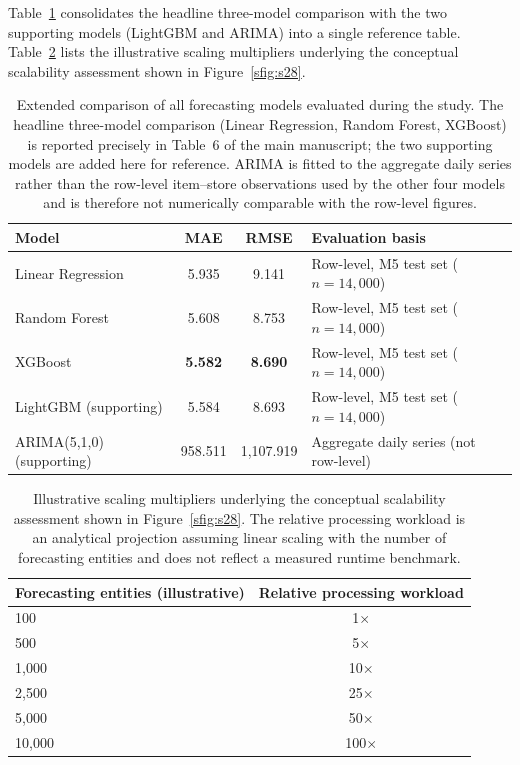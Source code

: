 \documentclass[preprint,12pt]{elsarticle}
\begin{document}
Table~\ref{stab:s1} consolidates the headline three-model comparison with the two supporting models (LightGBM and ARIMA) into a single reference table.
Table~\ref{stab:s2} lists the illustrative scaling multipliers underlying the conceptual scalability assessment shown in Figure~\ref{sfig:s28}.

\begin{table}[!t]
\centering
\caption{Extended comparison of all forecasting models evaluated during the study. The headline three-model comparison (Linear Regression, Random Forest, XGBoost) is reported precisely in Table~6 of the main manuscript; the two supporting models are added here for reference. ARIMA is fitted to the aggregate daily series rather than the row-level item--store observations used by the other four models and is therefore not numerically comparable with the row-level figures.}
\label{stab:s1}
\begin{tabular}{lccp{4.0cm}}
\toprule
\textbf{Model} & \textbf{MAE} & \textbf{RMSE} & \textbf{Evaluation basis} \\
\midrule
Linear Regression & 5.935 & 9.141 & Row-level, M5 test set ($n=14{,}000$) \\
Random Forest & 5.608 & 8.753 & Row-level, M5 test set ($n=14{,}000$) \\
XGBoost & \textbf{5.582} & \textbf{8.690} & Row-level, M5 test set ($n=14{,}000$) \\
LightGBM (supporting) & 5.584 & 8.693 & Row-level, M5 test set ($n=14{,}000$) \\
ARIMA(5,1,0) (supporting) & 958.511 & 1{,}107.919 & Aggregate daily series (not row-level) \\
\bottomrule
\end{tabular}
\end{table}

\begin{table}[!t]
\centering
\caption{Illustrative scaling multipliers underlying the conceptual scalability assessment shown in Figure~\ref{sfig:s28}. The relative processing workload is an analytical projection assuming linear scaling with the number of forecasting entities and does not reflect a measured runtime benchmark.}
\label{stab:s2}
\begin{tabular}{lc}
\toprule
\textbf{Forecasting entities (illustrative)} & \textbf{Relative processing workload} \\
\midrule
100 & 1$\times$ \\
500 & 5$\times$ \\
1{,}000 & 10$\times$ \\
2{,}500 & 25$\times$ \\
5{,}000 & 50$\times$ \\
10{,}000 & 100$\times$ \\
\bottomrule
\end{tabular}
\end{table}
\end{document}
